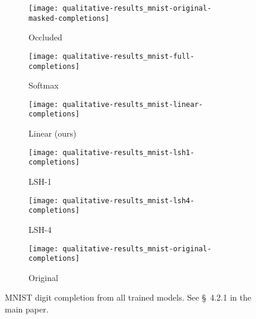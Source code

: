 \documentclass{article}
\begin{document}
\begin{figure*}[h]
    \centering
    \begin{subfigure}[t]{0.15\columnwidth}
        \centering
        \texttt{[image: qualitative-results\_mnist-original-masked-completions]}
        \caption{Occluded}
    \end{subfigure}
    \begin{subfigure}[t]{0.15\columnwidth}
        \centering
        \texttt{[image: qualitative-results\_mnist-full-completions]}
        \caption{Softmax}
    \end{subfigure}
    \begin{subfigure}[t]{0.15\columnwidth}
        \centering
        \texttt{[image: qualitative-results\_mnist-linear-completions]}
        \caption{Linear (ours)}
    \end{subfigure}
    \begin{subfigure}[t]{0.15\columnwidth}
        \centering
        \texttt{[image: qualitative-results\_mnist-lsh1-completions]}
        \caption{LSH-1}
    \end{subfigure}
    \begin{subfigure}[t]{0.15\columnwidth}
        \centering
        \texttt{[image: qualitative-results\_mnist-lsh4-completions]}
        \caption{LSH-4}
    \end{subfigure}
    \begin{subfigure}[t]{0.15\columnwidth}
        \centering
        \texttt{[image: qualitative-results\_mnist-original-completions]}
        \caption{Original}
    \end{subfigure}
    \caption{MNIST digit completion from all trained models.
             See \S~{4.2.1} in the main paper.}
    \label{fig:cifar_unconditional}
\end{figure*}
\end{document}
